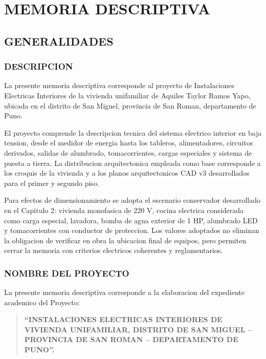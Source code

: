 \chapter*{MEMORIA DESCRIPTIVA}

\section{GENERALIDADES}

\subsection{DESCRIPCION}

La presente memoria descriptiva corresponde al proyecto de Instalaciones Electricas Interiores de la vivienda unifamiliar de Aquiles Taylor Ramos Yapo, ubicada en el distrito de San Miguel, provincia de San Roman, departamento de Puno.

El proyecto comprende la descripcion tecnica del sistema electrico interior en baja tension, desde el medidor de energia hasta los tableros, alimentadores, circuitos derivados, salidas de alumbrado, tomacorrientes, cargas especiales y sistema de puesta a tierra. La distribucion arquitectonica empleada como base corresponde a los croquis de la vivienda y a los planos arquitectonicos CAD v3 desarrollados para el primer y segundo piso.

Para efectos de dimensionamiento se adopta el escenario conservador desarrollado en el Capitulo 2: vivienda monofasica de 220 V, cocina electrica considerada como carga especial, lavadora, bomba de agua exterior de 1 HP, alumbrado LED y tomacorrientes con conductor de proteccion. Los valores adoptados no eliminan la obligacion de verificar en obra la ubicacion final de equipos, pero permiten cerrar la memoria con criterios electricos coherentes y reglamentarios.

\subsection{NOMBRE DEL PROYECTO}

La presente memoria descriptiva corresponde a la elaboracion del expediente academico del Proyecto:

\begin{quote}
\textbf{``INSTALACIONES ELECTRICAS INTERIORES DE VIVIENDA UNIFAMILIAR, DISTRITO DE SAN MIGUEL -- PROVINCIA DE SAN ROMAN -- DEPARTAMENTO DE PUNO''.}
\end{quote}

